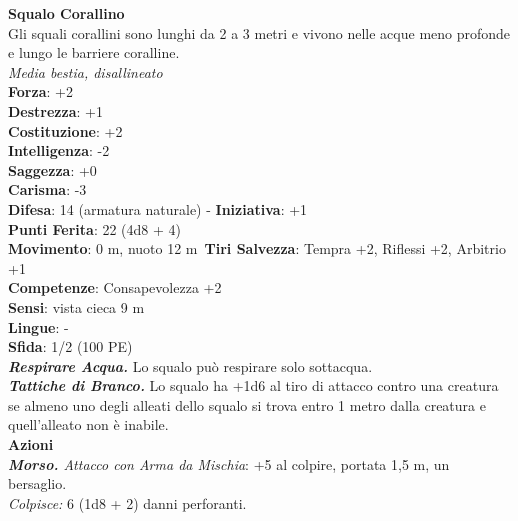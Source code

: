 \begin{multicols}{2}
\medskip\textbf{Squalo Corallino}\\
Gli squali corallini sono lunghi da 2 a 3 metri e vivono  nelle acque meno profonde e lungo le barriere coralline.\\
\emph{Media bestia, disallineato}\\
\textbf{Forza}: +2\\
\textbf{Destrezza}: +1\\
\textbf{Costituzione}: +2\\
\textbf{Intelligenza}: -2\\
\textbf{Saggezza}: +0\\
\textbf{Carisma}: -3\\
\textbf{Difesa}: 14 (armatura naturale) - \textbf{Iniziativa}: +1\\
\textbf{Punti Ferita}: 22 (4d8 + 4)\\
\textbf{Movimento}: 0 m, nuoto 12 m\
\textbf{Tiri Salvezza}: Tempra +2, Riflessi +2, Arbitrio +1\\
\textbf{Competenze}: Consapevolezza +2\\
\textbf{Sensi}: vista cieca 9 m\\
\textbf{Lingue}: -\\
\textbf{Sfida}: 1/2 (100 PE)\smallskip\\
\emph{\textbf{Respirare Acqua.}} Lo squalo può respirare solo sottacqua.\\
\emph{\textbf{Tattiche di Branco.}} Lo squalo ha +1d6 al tiro di attacco contro una creatura se almeno uno degli alleati dello squalo si  trova entro 1 metro dalla creatura e quell'alleato non è inabile.\\
\smallskip\textbf{Azioni}\\
\emph{\textbf{Morso.} Attacco con Arma da Mischia}: +5 al colpire, portata 1,5 m, un bersaglio.\\
\emph{Colpisce:} 6 (1d8 + 2) danni perforanti.\\


\end{multicols}
